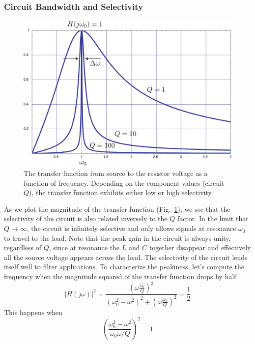 \subsubsection{Circuit Bandwidth and Selectivity}
\begin{figure}
\begin{center}
\includegraphics[width=.65\columnwidth]{transferrlc}
\end{center}
\caption{The transfer function from source to the resistor voltage as a function of frequency.  Depending on the component values (circuit $Q$), the transfer function exhibits either low or high selectivity.} \label{fig:transferrlc}
\end{figure}
As we plot the magnitude of the transfer function (Fig.~\ref{fig:transferrlc}), we see that the selectivity of the circuit is also related inversely to the $Q$ factor.  
In the limit that $Q \rightarrow \infty$, the circuit is infinitely selective and only allows signals at resonance $\omega_0$ to travel to the load.  Note that the peak gain in the circuit is always unity, regardless of $Q$, since at resonance the $L$ and $C$ together disappear and effectively all the source voltage appears across the load.  The selectivity of the circuit lends itself well to filter applications.  To characterize the peakiness, let's compute the frequency when the magnitude squared of the transfer function drops by half
    \begin{equation}
        | H(j\omega)|^2 = \frac{ \left(\omega \frac{\omega_0}{Q} \right)^2}{\left( \omega_0^2 - \omega^2\right)^2 + \left( \omega \frac{\omega_0}{Q}\right)^2} = \frac{1}{2}
    \end{equation}
This happens when
    \begin{equation}
        \left( \frac{\omega_0^2 - \omega^2}{\omega_0\omega / Q}\right)^2 = 1
    \end{equation}
